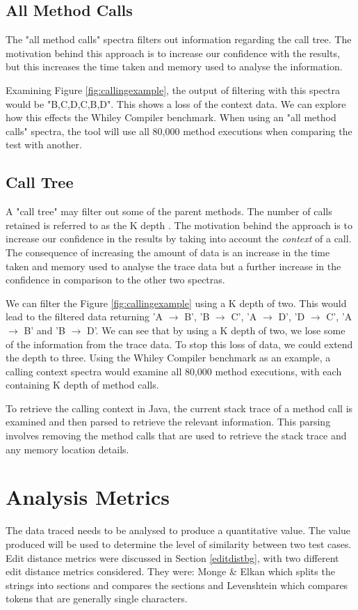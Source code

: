 \subsection{All Method Calls}
The "all method calls" spectra filters out information regarding the call tree. The motivation behind this approach is to increase our confidence with the results, but this increases the time taken and memory used to analyse the information.

Examining Figure \ref{fig:callingexample}, the output of filtering with this spectra would be "B,C,D,C,B,D". This shows a loss of the context data. We can explore how this effects the Whiley Compiler benchmark. When using an "all method calls" spectra, the tool will use all 80,000 method executions when comparing the test with another.

\subsection{Call Tree}
A "call tree" may filter out some of the parent methods. The number of calls retained is referred to as the K depth \cite{Zhuang06accurate}. The motivation behind the approach is to increase our confidence in the results by taking into account the \textit{context} of a call. The consequence of increasing the amount of data is an increase in the time taken and memory used to analyse the trace data but a further increase in the confidence in comparison to the other two spectras.

We can filter the Figure \ref{fig:callingexample} using a K depth of two. This would lead to the filtered data returning 'A $\rightarrow$ B', 'B $\rightarrow$ C', 'A $\rightarrow$ D', 'D $\rightarrow$ C', 'A $\rightarrow$ B' and 'B $\rightarrow$ D'. We can see that by using a K depth of two, we lose some of the information from the trace data. To stop this loss of data, we could extend the depth to three. Using the Whiley Compiler benchmark as an example, a calling context spectra would examine all 80,000 method executions, with each containing K depth of method calls. 

To retrieve the calling context in Java, the current stack trace of a method call is examined and then parsed to retrieve the relevant information. This parsing involves removing the method calls that are used to retrieve the stack trace and any memory location details. 

\section{Analysis Metrics }
\label{S:metrics}
The data traced needs to be analysed to produce a quantitative value. The value produced will be used to determine the level of similarity between two test cases. Edit distance metrics were discussed in Section \ref{editdistbg}, with two different edit distance metrics considered. They were: Monge \& Elkan \cite{monge1997efficient} which splits the strings into sections and compares the sections and Levenshtein \cite{levenshtein1966binary} which compares tokens that are generally single characters. 

